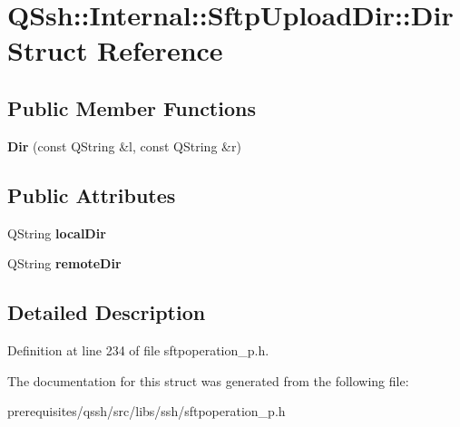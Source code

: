 \hypertarget{struct_q_ssh_1_1_internal_1_1_sftp_upload_dir_1_1_dir}{}\section{Q\+Ssh\+:\+:Internal\+:\+:Sftp\+Upload\+Dir\+:\+:Dir Struct Reference}
\label{struct_q_ssh_1_1_internal_1_1_sftp_upload_dir_1_1_dir}
\subsection*{Public Member Functions}
\begin{DoxyCompactItemize}
\item 
\mbox{\label{struct_q_ssh_1_1_internal_1_1_sftp_upload_dir_1_1_dir_a5060112ae9ff2de627ef39fda35747bf}} 
{\bfseries Dir} (const Q\+String \&l, const Q\+String \&r)
\end{DoxyCompactItemize}
\subsection*{Public Attributes}
\begin{DoxyCompactItemize}
\item 
\mbox{\label{struct_q_ssh_1_1_internal_1_1_sftp_upload_dir_1_1_dir_a051ad5cdf8a4fa25f25e2ed222d931a4}} 
Q\+String {\bfseries local\+Dir}
\item 
\mbox{\label{struct_q_ssh_1_1_internal_1_1_sftp_upload_dir_1_1_dir_a899a79b0ac19cfef1dd1ccd8a4cd9da2}} 
Q\+String {\bfseries remote\+Dir}
\end{DoxyCompactItemize}


\subsection{Detailed Description}


Definition at line 234 of file sftpoperation\+\_\+p.\+h.



The documentation for this struct was generated from the following file\+:\begin{DoxyCompactItemize}
\item 
prerequisites/qssh/src/libs/ssh/sftpoperation\+\_\+p.\+h\end{DoxyCompactItemize}
